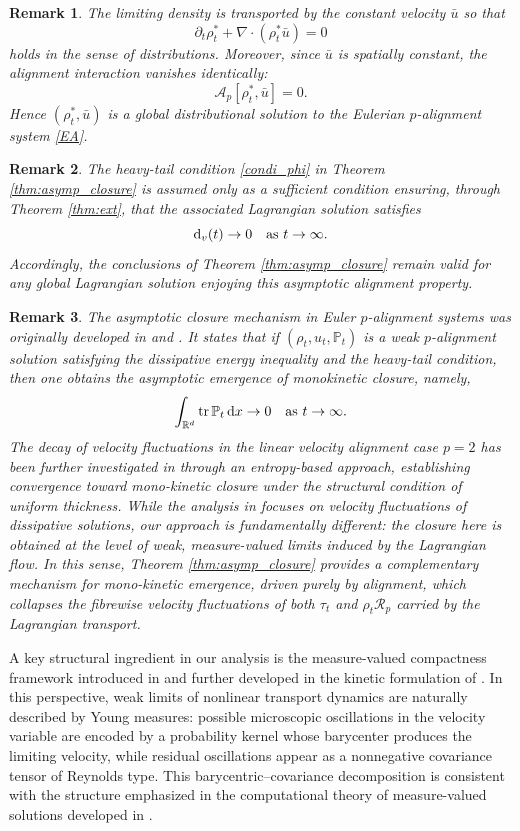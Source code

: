 \documentclass[10pt,reqno]{amsart}
\numberwithin{equation}{section}
\newtheorem{remark}{Remark}[section]
\newcommand{\R}{\mathbb R}
\newcommand{\pa}{\partial}
\newcommand{\intr}{\int_{\R^d}}
\newcommand{\calA}{\mathcal A}
\newcommand{\calR}{\mathcal R}
\newcommand{\rd}{\textnormal{d}}
\newcommand{\dx}{\textnormal{d}x}
\newcommand{\tr}{\textnormal{tr}}
\begin{document}
 
 
\begin{remark} The limiting density is transported by the constant velocity $\bar u$ so that
\[
\pa_t\rho_t^\ast+\nabla\cdot(\rho_t^\ast \bar u)=0
\]
holds in the sense of distributions. Moreover, since $\bar u$ is spatially constant, the alignment interaction vanishes identically:
\[
\calA_p[\rho_t^\ast,\bar u]=0.
\]
Hence $(\rho_t^\ast,\bar u)$ is a global distributional solution to the Eulerian $p$-alignment system \eqref{EA}.
\end{remark}
 


\begin{remark}
The heavy-tail condition \eqref{condi_phi} in Theorem \ref{thm:asymp_closure} is assumed only as a sufficient condition ensuring, through Theorem \ref{thm:ext}, that the associated Lagrangian solution satisfies
\[
\rd_v(t)\to0 \quad\text{as }t\to\infty.
\]
Accordingly, the conclusions of Theorem \ref{thm:asymp_closure} remain valid for any global Lagrangian solution enjoying this asymptotic alignment property.
\end{remark}

 
\begin{remark}
The asymptotic closure mechanism in Euler $p$-alignment systems was originally developed  in \cite[Corollary 4.2]{Tad23} and \cite[Theorem 4]{Tadpre}. It states that if $(\rho_t,u_t,{\mathbb P}_t)$ is a weak $p$-alignment solution satisfying the dissipative energy inequality and the  heavy-tail condition, then one obtains the asymptotic emergence of monokinetic closure, namely,
\[
\intr \tr \,\mathbb P_t \,\dx \to 0  \quad \text{as }t\to\infty.
\]
The decay of velocity fluctuations in the linear velocity alignment case $p=2$ has been further investigated in \cite{Tadpre} through an entropy-based approach, establishing convergence toward mono-kinetic closure under the structural condition of uniform thickness. While the analysis in \cite{Tad23,Tadpre} focuses on velocity fluctuations of dissipative solutions, our approach is fundamentally different: the closure here is obtained at the level of weak, measure-valued limits induced by the Lagrangian flow. In this sense, Theorem \ref{thm:asymp_closure} provides a complementary mechanism for mono-kinetic emergence, driven purely by alignment, which collapses the fibrewise velocity fluctuations of both $\tau_t$ and $\rho_t\calR_p$ carried by the Lagrangian transport.
\end{remark}

A key structural ingredient in our analysis is the measure-valued compactness framework introduced in \cite{DiP85} and further developed in the kinetic formulation of \cite{LPT94}. In this perspective, weak limits of nonlinear transport dynamics are naturally described by Young measures: possible microscopic oscillations in the velocity variable are encoded by a probability kernel whose barycenter produces the limiting velocity, while residual oscillations appear as a nonnegative covariance tensor of Reynolds type. This barycentric--covariance decomposition is consistent with the structure emphasized in the computational theory of measure-valued solutions developed in \cite{FMT16}. 
\end{document}
